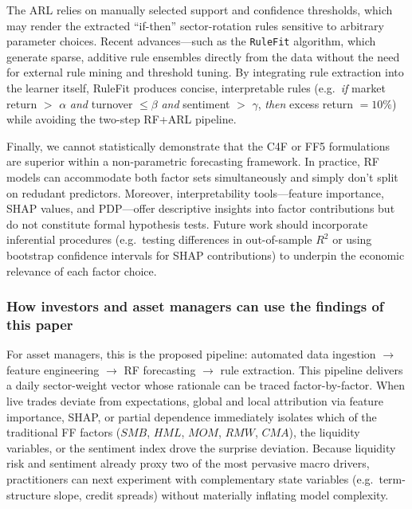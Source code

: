 The ARL relies on manually selected support and confidence thresholds, which may render the extracted “if-then” sector-rotation rules sensitive to arbitrary parameter choices. Recent advances—such as the \texttt{RuleFit} algorithm, which generate sparse, additive rule ensembles directly from the data without the need for external rule mining and threshold tuning. By integrating rule extraction into the learner itself, RuleFit produces concise, interpretable rules (e.g.\ \emph{if} market return $>$ $\alpha$ \emph{and} turnover $\le \beta$ \emph{and} sentiment $>$ $\gamma$, \emph{then} excess return $=10\%$) while avoiding the two-step RF+ARL pipeline.

Finally, we cannot statistically demonstrate that the C4F or FF5 formulations are superior within a non-parametric forecasting framework. In practice, RF models can accommodate both factor sets simultaneously and simply don't split on redudant predictors. Moreover, interpretability tools—feature importance, SHAP values, and PDP—offer descriptive insights into factor contributions but do not constitute formal hypothesis tests. Future work should incorporate inferential procedures (e.g.\ testing differences in out-of-sample $R^2$ or using bootstrap confidence intervals for SHAP contributions) to underpin the economic relevance of each factor choice.

\subsubsection{How investors and asset managers can use the findings of this paper}
For asset managers, this is the proposed pipeline: automated data ingestion $\rightarrow$ feature engineering $\rightarrow$ RF forecasting $\rightarrow$ rule extraction. This pipeline delivers a daily sector-weight vector whose rationale can be traced factor-by-factor. When live trades deviate from expectations, global and local attribution via feature importance, SHAP, or partial dependence immediately isolates which of the traditional FF factors ($SMB$, $HML$, $MOM$, $RMW$, $CMA$), the liquidity variables, or the sentiment index drove the surprise deviation. Because liquidity risk and sentiment already proxy two of the most pervasive macro drivers, practitioners can next experiment with complementary state variables (e.g.\ term-structure slope, credit spreads) without materially inflating model complexity.


